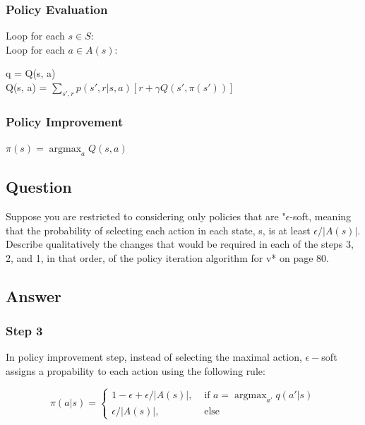 \documentclass[11pt]{article}
\DeclareMathOperator*{\argmax}{argmax}
\begin{document}
    \subsubsection*{Policy Evaluation}
    Loop for each $ s \in S $: \\
    Loop for each $ a \in A(s) $: \\
    \begin{itemize}
        q = Q(s, a) \\
        Q(s, a) = $ \sum_{s',r} p(s',r| s, a) [ r + \gamma Q(s', \pi(s'))  ] $
    \end{itemize}

    \subsubsection*{Policy Improvement}
    $ \pi(s) = \argmax_{a} Q(s, a) $

    \subsection{Question}

    Suppose you are restricted to considering only policies that are "$\epsilon$-soft, meaning that the probability of selecting each action in each state, s, is at least $\epsilon/|A(s)|$.
    Describe qualitatively the changes that would be required in each of the steps 3, 2, and 1, in that order, of the policy iteration algorithm for v* on page 80.

    \subsection*{Answer}

    \subsubsection*{Step 3}

    In policy improvement step, instead of selecting the maximal action, $ \epsilon-$soft assigns a propability to each action using the following rule:

    \begin{equation}
        \pi(a|s) =
        \begin{cases}
            1-\epsilon + \epsilon/|A(s)|,& \text{ if } a = \argmax_{a'}q(a'|s) \\
            \epsilon/|A(s)|,& \text{ else }
        \end{cases}
    \end{equation}
\end{document}
